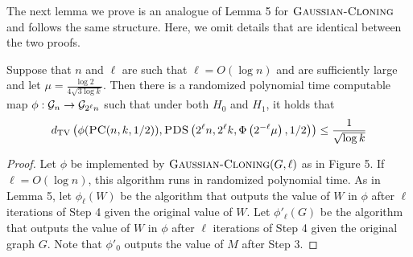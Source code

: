 \documentclass[11pt]{article}
\begin{document}
The next lemma we prove is an analogue of Lemma 5 for $\textsc{Gaussian-Cloning}$ and follows the same structure. Here, we omit details that are identical between the two proofs.

\begin{lemma}
Suppose that $n$ and $\ell$ are such that $\ell = O(\log n)$ and are sufficiently large and let $\mu = \frac{\log 2}{4 \sqrt{3 \log k}}$. Then there is a randomized polynomial time computable map $\phi : \mathcal{G}_n \to \mathcal{G}_{2^\ell n}$ such that under both $H_0$ and $H_1$, it holds that
$$d_{\text{TV}}\left( \phi(\textsc{PC}(n, k, 1/2)), \textsc{PDS}\left(2^\ell n, 2^\ell k, \Phi\left(2^{-\ell}\mu\right), 1/2 \right) \right) \le \frac{1}{\sqrt{\log k}}$$
\end{lemma}

\begin{proof}
Let $\phi$ be implemented by $\textsc{Gaussian-Cloning}(G, \ell)$ as in Figure 5. If $\ell = O(\log n)$, this algorithm runs in randomized polynomial time. As in Lemma 5, let $\phi_\ell(W)$ be the algorithm that outputs the value of $W$ in $\phi$ after $\ell$ iterations of Step 4 given the original value of $W$. Let $\phi'_\ell(G)$ be the algorithm that outputs the value of $W$ in $\phi$ after $\ell$ iterations of Step 4 given the original graph $G$. Note that $\phi'_0$ outputs the value of $M$ after Step 3.


\end{proof}
\end{document}
